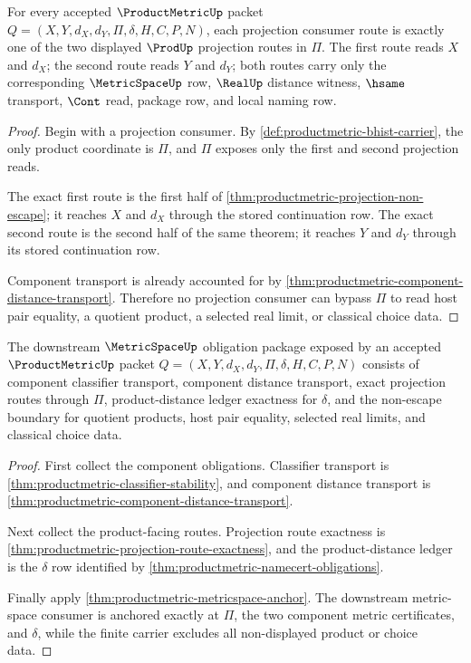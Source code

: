\begin{theorem}
\label{thm:productmetric-projection-route-exactness}
For every accepted $\ProductMetricUp$ packet $Q=(X,Y,d_X,d_Y,\Pi,\delta,H,C,P,N)$, each projection consumer route is exactly one of the two displayed $\ProdUp$ projection routes in $\Pi$. The first route reads $X$ and $d_X$; the second route reads $Y$ and $d_Y$; both routes carry only the corresponding $\MetricSpaceUp$ row, $\RealUp$ distance witness, $\hsame$ transport, $\Cont$ read, package row, and local naming row.
\end{theorem}
\begin{proof}
Begin with a projection consumer. By \autoref{def:productmetric-bhist-carrier}, the only product coordinate is $\Pi$, and $\Pi$ exposes only the first and second projection reads.

The exact first route is the first half of \autoref{thm:productmetric-projection-non-escape}; it reaches $X$ and $d_X$ through the stored continuation row. The exact second route is the second half of the same theorem; it reaches $Y$ and $d_Y$ through its stored continuation row.

Component transport is already accounted for by \autoref{thm:productmetric-component-distance-transport}. Therefore no projection consumer can bypass $\Pi$ to read host pair equality, a quotient product, a selected real limit, or classical choice data.
\end{proof}

\begin{theorem}
\label{thm:productmetric-metricspace-obligation-package}
The downstream $\MetricSpaceUp$ obligation package exposed by an accepted $\ProductMetricUp$ packet $Q=(X,Y,d_X,d_Y,\Pi,\delta,H,C,P,N)$ consists of component classifier transport, component distance transport, exact projection routes through $\Pi$, product-distance ledger exactness for $\delta$, and the non-escape boundary for quotient products, host pair equality, selected real limits, and classical choice data.
\end{theorem}
\begin{proof}
First collect the component obligations. Classifier transport is \autoref{thm:productmetric-classifier-stability}, and component distance transport is \autoref{thm:productmetric-component-distance-transport}.

Next collect the product-facing routes. Projection route exactness is \autoref{thm:productmetric-projection-route-exactness}, and the product-distance ledger is the $\delta$ row identified by \autoref{thm:productmetric-namecert-obligations}.

Finally apply \autoref{thm:productmetric-metricspace-anchor}. The downstream metric-space consumer is anchored exactly at $\Pi$, the two component metric certificates, and $\delta$, while the finite carrier excludes all non-displayed product or choice data.
\end{proof}


